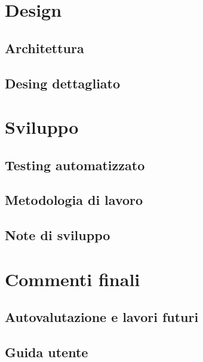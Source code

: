 \documentclass[a4paper,12pt]{report}
\begin{document}
\chapter{Design}
\section{Architettura}
\section{Desing dettagliato}
\chapter{Sviluppo}
\section{Testing automatizzato}
\section{Metodologia di lavoro}
\section{Note di sviluppo}
\chapter{Commenti finali}
\section{Autovalutazione e lavori futuri}

\appendix
\section{Guida utente}
\end{document}
